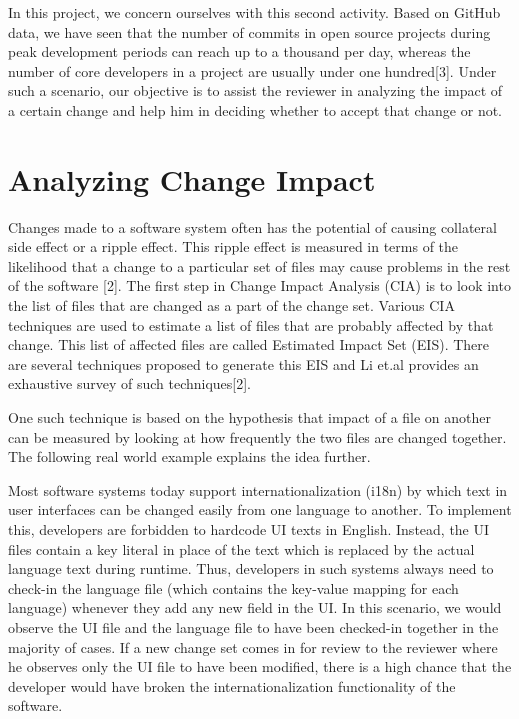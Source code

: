 In this project, we concern ourselves with this second activity. Based on GitHub data, we have seen that the number of commits in open source projects during peak development periods can reach up to a thousand per day, whereas the number of core developers in a project are usually under one hundred[3]. Under such a scenario, our objective is to assist the reviewer in analyzing the impact of a certain change and help him in deciding whether to accept that change or not.\\

\section{Analyzing Change Impact}

Changes made to a software system often has the potential of causing collateral side effect or a ripple effect. This ripple effect is measured in terms of the likelihood that a change to a particular set of files may cause problems in the rest of the software [2]. The first step in Change Impact Analysis (CIA) is to look into the list of files that are changed as a part of the change set. Various CIA techniques are used to estimate a list of files that are probably affected by that change. This list of affected files are called Estimated Impact Set (EIS). There are several techniques proposed to generate this EIS and Li et.al provides an exhaustive survey of such techniques[2].

One such technique is based on the hypothesis that impact of a file on another can be measured by looking at how frequently the two files are changed together. The following real world example explains the idea further.

Most software systems today support internationalization (i18n) by which text in user interfaces can be changed easily from one language to another. To implement this, developers are forbidden to hardcode UI texts in English. Instead, the UI files contain a key literal in place of the text which is replaced by the actual language text during runtime. Thus, developers in such systems always need to check-in the language file (which contains the key-value mapping for each language) whenever they add any new field in the UI. In this scenario, we would observe the UI file and the language file to have been checked-in together in the majority of cases. If a new change set comes in for review to the reviewer where he observes only the UI file to have been modified, there is a high chance that the developer would have broken the internationalization functionality of the software.


